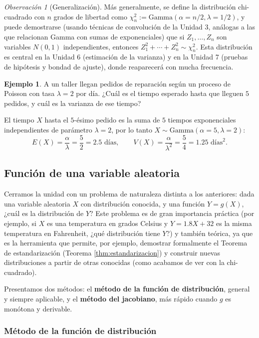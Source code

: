 \documentclass[11pt,a4paper]{article}
\theoremstyle{plain}
\theoremstyle{definition}
\newtheorem{ejemplo}[teorema]{Ejemplo}
\theoremstyle{remark}
\newtheorem{observacion}[teorema]{Observación}
\begin{document}
\begin{observacion}[Generalización]
Más generalmente, se define la distribución chi-cuadrado con $n$ grados de libertad como $\chi^2_n:=\text{Gamma}(\alpha=n/2,\lambda=1/2)$, y puede demostrarse (usando técnicas de convolución de la Unidad 3, análogas a las que relacionan Gamma con sumas de exponenciales) que si $Z_1,\dots,Z_n$ son variables $N(0,1)$ independientes, entonces $Z_1^2+\cdots+Z_n^2\sim\chi^2_n$. Esta distribución es central en la Unidad 6 (estimación de la varianza) y en la Unidad 7 (pruebas de hipótesis y bondad de ajuste), donde reaparecerá con mucha frecuencia.
\end{observacion}

\begin{ejemplo}
A un taller llegan pedidos de reparación según un proceso de Poisson con tasa $\lambda=2$ por día. ¿Cuál es el tiempo esperado hasta que lleguen $5$ pedidos, y cuál es la varianza de ese tiempo?

El tiempo $X$ hasta el $5$-ésimo pedido es la suma de $5$ tiempos exponenciales independientes de parámetro $\lambda=2$, por lo tanto $X\sim\text{Gamma}(\alpha=5,\lambda=2)$:
$$E(X)=\frac{\alpha}{\lambda}=\frac52=2.5\text{ días},\qquad V(X)=\frac{\alpha}{\lambda^2}=\frac54=1.25\text{ días}^2.$$
\end{ejemplo}

\subsection{Función de una variable aleatoria}\label{sec:transformaciones}

Cerramos la unidad con un problema de naturaleza distinta a los anteriores: dada una variable aleatoria $X$ con distribución conocida, y una función $Y=g(X)$, ¿cuál es la distribución de $Y$? Este problema es de gran importancia práctica (por ejemplo, si $X$ es una temperatura en grados Celsius y $Y=1.8X+32$ es la misma temperatura en Fahrenheit, ¿qué distribución tiene $Y$?) y también teórica, ya que es la herramienta que permite, por ejemplo, demostrar formalmente el Teorema de estandarización (Teorema \ref{thm:estandarizacion}) y construir nuevas distribuciones a partir de otras conocidas (como acabamos de ver con la chi-cuadrado).

Presentamos dos métodos: el \textbf{método de la función de distribución}, general y siempre aplicable, y el \textbf{método del jacobiano}, más rápido cuando $g$ es monótona y derivable.

\subsubsection{Método de la función de distribución}
\end{document}
